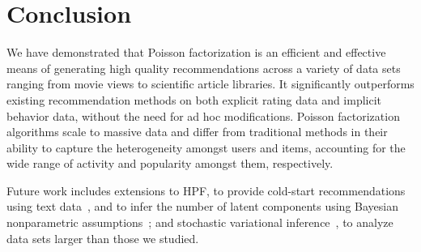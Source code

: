 \section{Conclusion}
We have demonstrated that Poisson factorization is an efficient and
effective means of generating high quality recommendations across a
variety of data sets ranging from movie views to scientific article
libraries. It significantly outperforms existing recommendation
methods on both explicit rating data and implicit behavior data,
without the need for ad hoc modifications.  Poisson factorization
algorithms scale to massive data and differ from traditional methods
in their ability to capture the heterogeneity amongst users and items,
accounting for the wide range of activity and popularity amongst them,
respectively.


Future work includes extensions to HPF, to provide cold-start recommendations
using text data~\cite{Wang:2011b}, and to infer the number of latent components
using Bayesian nonparametric assumptions~\cite{Zhou:2012}; and stochastic
variational inference~\cite{Hoffman:2013}, to analyze data sets larger than
those we studied.





